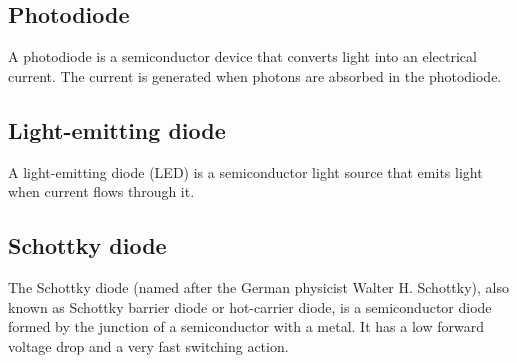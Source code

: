 \subsection{Photodiode}

A photodiode is a semiconductor device that converts light into an electrical current. The current is generated when photons are absorbed in the photodiode.

\subsection{Light-emitting diode}

A light-emitting diode (LED) is a semiconductor light source that emits light when current flows through it.

\subsection{Schottky diode}

The Schottky diode (named after the German physicist Walter H. Schottky), also known as Schottky barrier diode or hot-carrier diode, is a semiconductor diode formed by the junction of a semiconductor with a metal. It has a low forward voltage drop and a very fast switching action.



